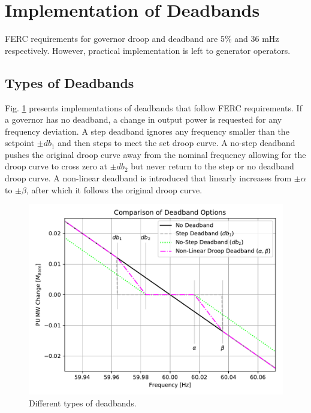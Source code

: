 \section{Implementation of Deadbands}
FERC requirements for governor droop and deadband are 5\% and 36 mHz respectively\cite{ferc2018}.
However, practical implementation is left to generator operators.

\subsection{Types of Deadbands}
Fig. \ref{fig: deadbandType} presents implementations of deadbands that follow FERC requirements.
If a governor has no deadband, a change in output power is requested for any frequency deviation.
A step deadband ignores any frequency smaller than the setpoint $\pm db_1$ and then steps to meet the set droop curve.
A no-step deadband pushes the original droop curve away from the nominal frequency allowing for the droop curve to cross zero at $\pm db_2$ but never return to the step or no deadband droop curve.
A non-linear deadband is introduced that linearly increases from $\pm \alpha$ to $\pm \beta$, after which it follows the original droop curve.

\begin{figure}[!ht]
	\centering
	\includegraphics[width=\linewidth]{figures/dbAction3}
	\caption{Different types of deadbands.}
	\label{fig: deadbandType}
\end{figure}